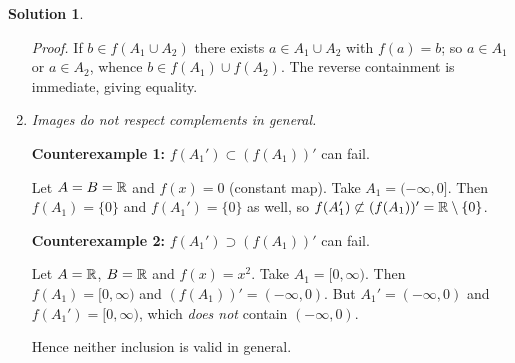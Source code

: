 \documentclass[12pt]{article}
\theoremstyle{definition} %
\newtheorem{solution}{Solution}
\theoremstyle{plain} %
\begin{document}
\begin{solution}
\begin{enumerate}[label=\textbf{(\alph*)}]
      \emph{Proof.}
      If \(b\in f(A_{1}\cup A_{2})\) there exists \(a\in A_{1}\cup A_{2}\)
      with \(f(a)=b\); so \(a\in A_{1}\) or \(a\in A_{2}\), whence
      \(b\in f(A_{1})\cup f(A_{2})\).
      The reverse containment is immediate, giving equality.

\item \textit{Images do not respect complements in general.}

      \medskip\noindent
      \textbf{Counterexample 1:} \(f(A_{1}')\subset (f(A_{1}))'\) can fail.

      Let \(A=B=\Bbb R\) and \(f(x)=0\) (constant map).
      Take \(A_{1}=(-\infty,0]\).
      Then \(f(A_{1})=\{0\}\) and \(f(A_{1}')=\{0\}\) as well, so
      \(f(A_{1}')\not\subset (f(A_{1}))'=\Bbb R\setminus\{0\}\).

      \medskip\noindent
      \textbf{Counterexample 2:} \(f(A_{1}')\supset (f(A_{1}))'\) can fail.

      Let \(A=\Bbb R\), \(B=\Bbb R\) and \(f(x)=x^{2}\).
      Take \(A_{1}=[0,\infty)\).
      Then \(f(A_{1})=[0,\infty)\) and
      \((f(A_{1}))'=(-\infty,0)\).
      But \(A_{1}'=(-\infty,0)\) and
      \(f(A_{1}') = [0,\infty)\), which \emph{does not} contain
      \((-\infty,0)\).

      Hence neither inclusion is valid in general.
\end{enumerate}
\end{solution}
\end{document}
